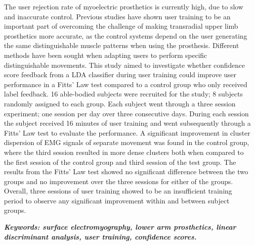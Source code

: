 

The user rejection rate of myoelectric prosthetics is currently high, due to slow and inaccurate control. Previous studies have shown user training to be an important part of overcoming the challenge of making transradial upper limb prosthetics more accurate, as the control systems depend on the user generating the same distinguishable muscle patterns when using the prosthesis. Different methods have been sought when adapting users to perform specific distinguishable movements. This study aimed to investigate whether confidence score feedback from a LDA classifier during user training could improve user performance in a Fitts' Law test compared to a control group who only received label feedback. %
16 able-bodied subjects were recruited for the study; 8 subjects randomly assigned to each group. Each subject went through a three session experiment; one session per day over three consecutive days. During each session the subject received 16 minutes of user training and went subsequently through a Fitts' Law test to evaluate the performance.
A significant improvement in cluster dispersion of EMG signals of separate movement was found in the control group, where the third session resulted in more dense clusters both when compared to the first session of the control group and third session of the test group. The results from the Fitts' Law test showed no significant difference between the two groups and no improvement over the three sessions for either of the groups. Overall, three sessions of user training showed to be an insufficient training period to observe any significant improvement within and between subject groups.

\textit{\textbf{Keywords: surface electromyography, lower arm prosthetics, linear discriminant analysis, user training, confidence scores.}}